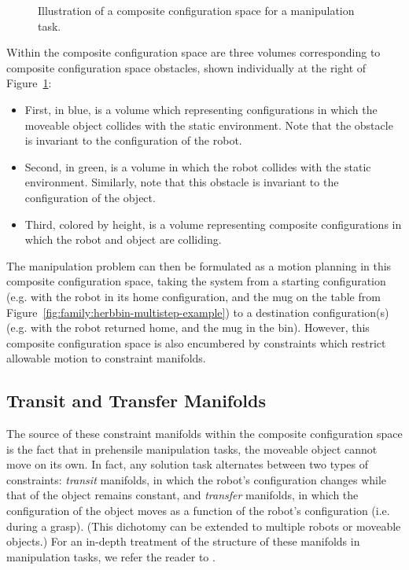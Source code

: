 \begin{figure}
   \centering
   \caption{Illustration of a composite configuration space
      for a manipulation task.}
   \label{fig:family:composite-volumes}
\end{figure}

Within the composite configuration space are three volumes
corresponding to composite configuration space obstacles,
shown individually at the right
of Figure~\ref{fig:family:composite-volumes}:
\begin{itemize}
\item First, in blue, is a volume which representing configurations
   in which the moveable object collides with the static environment.
   Note that the obstacle is invariant to the configuration of the robot.
\item Second, in green, is a volume in which the robot collides with
   the static environment.
   Similarly, note that this obstacle is invariant to the configuration
   of the object.
\item Third, colored by height, is a volume representing
   composite configurations in which the robot and object are colliding.
\end{itemize}
The manipulation problem can then be formulated as a motion planning
in this composite configuration space,
taking the system from a starting configuration
(e.g. with the robot in its home configuration, and the mug on the table
from Figure~\ref{fig:family:herbbin-multistep-example})
to a destination configuration(s)
(e.g. with the robot returned home, and the mug in the bin).
However,
this composite configuration space
is also encumbered by constraints which restrict allowable motion
to constraint manifolds.

\subsection{Transit and Transfer Manifolds}
The source of these constraint manifolds within the composite
configuration space is the fact that in prehensile manipulation tasks,
the moveable object cannot move on its own.
In fact,
any solution task alternates between two types of constraints:
\emph{transit} manifolds,
in which the robot's configuration changes while that of the object
remains constant,
and \emph{transfer} manifolds,
in which the configuration of the object moves as a function of
the robot's configuration (i.e. during a grasp).
(This dichotomy can be extended to multiple robots or
moveable objects.)
For an in-depth treatment of the structure of these manifolds
in manipulation tasks,
we refer the reader to \citep{simeon2004manipulation}.

